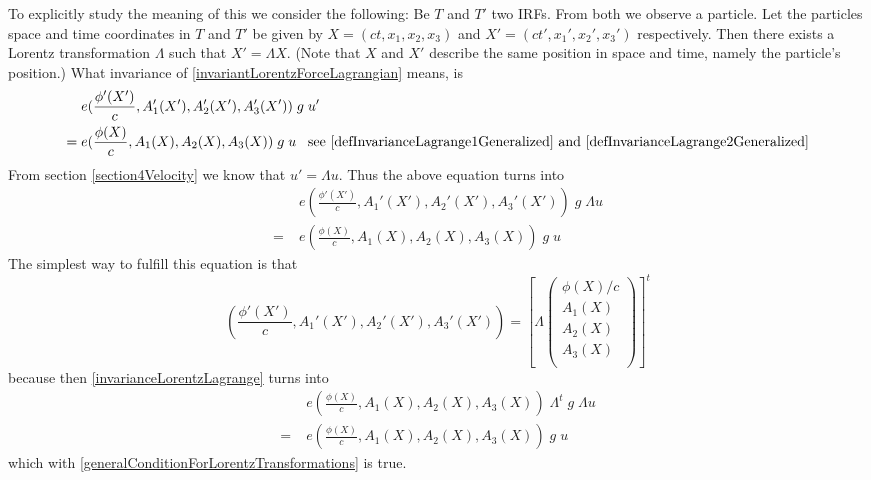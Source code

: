 \documentclass{article}
\begin{document}
To explicitly study the meaning of this we consider the following:
Be $T$ and $T'$ two IRFs.
From both we observe a particle.
Let the particles space and time coordinates in $T$ and $T'$ be given by $X = (ct,x_1,x_2,x_3)$ and $X' = (ct',x_1',x_2',x_3')$ respectively.
Then there exists a Lorentz transformation $\Lambda$ such that $X' = \Lambda X$.
(Note that $X$ and $X'$ describe the same position in space and time, namely the particle's position.)
What invariance of \ref{invariantLorentzForceLagrangian} means, is
\begin{align}
    &\;e (\frac{\phi'(X')}{c} , A_1'(X'), A_2'(X'), A_3'(X')) \; g \; u' \nonumber \\
    = &\;e (\frac{\phi(X)}{c} , A_1(X), A_2(X), A_3(X)) \; g \; u \;\;\; \text{see \ref{defInvarianceLagrange1Generalized} and \ref{defInvarianceLagrange2Generalized}} \nonumber \\
\end{align}
From section \ref{section4Velocity} we know that $u'=\Lambda u$.
Thus the above equation turns into
\begin{align}
    &\;e (\frac{\phi'(X')}{c} , A_1'(X'), A_2'(X'), A_3'(X')) \; g \; \Lambda u \nonumber \\
    = &\;e (\frac{\phi(X)}{c} , A_1(X), A_2(X), A_3(X)) \; g \; u \label{invarianceLorentzLagrange}
\end{align}
The simplest way to fulfill this equation is that
\begin{equation}
    (\frac{\phi'(X')}{c} , A_1'(X'), A_2'(X'), A_3'(X'))
    = \left[ \Lambda
           \left(\begin{array}{c}
                     \phi(X) / c \\
                     A_1(X)\\
                     A_2(X)\\
                     A_3(X)\\
           \end{array} \right) \right]^t
\end{equation}
because then \ref{invarianceLorentzLagrange} turns into
\begin{align}
&\;e (\frac{\phi(X)}{c} , A_1(X), A_2(X), A_3(X)) \; \Lambda^t \; g \; \Lambda u \nonumber \\
= &\;e (\frac{\phi(X)}{c} , A_1(X), A_2(X), A_3(X)) \; g \; u \nonumber
\end{align}
which with \ref{generalConditionForLorentzTransformations} is true.
\end{document}

